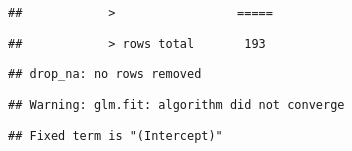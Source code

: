 \documentclass[
]{article}
\begin{document}
\begin{verbatim}
##            >                 =====
\end{verbatim}

\begin{verbatim}
##            > rows total       193
\end{verbatim}

\begin{verbatim}
## drop_na: no rows removed
\end{verbatim}

\begin{verbatim}
## Warning: glm.fit: algorithm did not converge
\end{verbatim}

\begin{verbatim}
## Fixed term is "(Intercept)"
\end{verbatim}
\end{document}
